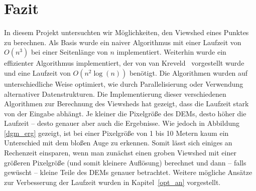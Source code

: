 \section{Fazit}
In diesem Projekt untersuchten wir Möglichkeiten, den Viewshed eines Punktes zu berechnen.
Als Basis wurde ein naiver Algorithmus mit einer Laufzeit von $O(n^3)$ bei einer Seitenlänge von $n$ implementiert.
Weiterhin wurde ein effizienter Algorithmus implementiert, der von van Kreveld~\cite{vanKrev} vorgestellt wurde und eine Laufzeit von $O(n^2\log(n))$ benötigt.
Die Algorithmen wurden auf unterschiedliche Weise optimiert, wie durch Parallelisierung oder Verwendung alternativer Datenstrukturen.
Die Implementierung dieser verschiedenen Algorithmen zur Berechnung des Viewsheds hat gezeigt, dass die Laufzeit stark von der Eingabe abhängt.
Je kleiner die Pixelgröße des DEMs, desto höher die Laufzeit -- desto genauer aber auch die Ergebnisse.
Wie jedoch in Abbildung \ref{dgm_erg} gezeigt, ist bei einer Pixelgröße von 1 bis 10 Metern kaum ein Unterschied mit dem bloßen Auge zu erkennen.
Somit lässt sich einiges an Rechenzeit einsparen,
wenn man zunächst einen groben Viewshed mit einer größeren Pixelgröße (und somit kleinere Auflösung) berechnet
und dann -- falls gewüscht -- kleine Teile des DEMs genauer betrachtet.
Weitere mögliche Ansätze zur Verbesserung der Laufzeit wurden in Kapitel~\ref{opt_an} vorgestellt.
